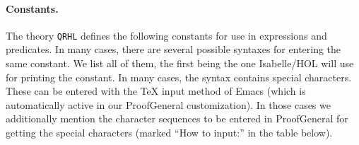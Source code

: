 \documentclass{article}
\begin{document}
\paragraph{Constants.} The theory \texttt{QRHL} defines the following
constants for use in expressions and predicates. In many cases, there
are several possible syntaxes for entering the same constant. We list
all of them, the first being the one Isabelle/HOL will use for
printing the constant. In many cases, the syntax contains special
characters. These can be entered with the TeX input method of Emacs
(which is automatically active in our ProofGeneral customization). In
those cases we additionally mention the character sequences to be entered in ProofGeneral
for getting the special characters (marked ``How to input:'' in the table below).

\newcommand\constdef[3]{#1\par
  \hskip1em\begin{minipage}{\hsize-1em}\raggedright $::#2$\end{minipage}%
  \ifx!#3!\hskip-1em\noindent\else\par\medskip\small(for #3)\fi}

\newcommand\subhead[1]{\multicolumn{2}{r@{}}{\footnotesize\bfseries #1}\\}

\DeclareRobustCommand\texinput[1]{\textbf{How to input:} \texttt{\def\\{\textbackslash}#1}}

\newcommand\toolconst[1]{\index{#1@\textttOLD{#1} (Isabelle/HOL constant)}}
\end{document}

